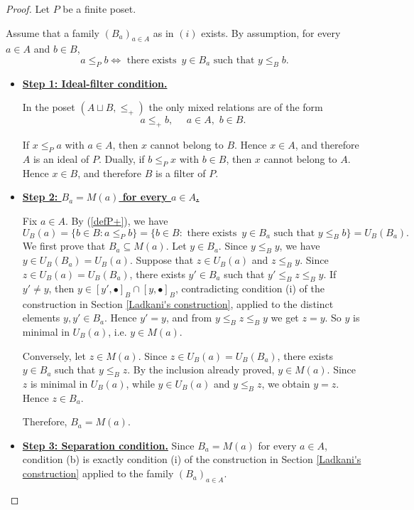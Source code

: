 \begin{proof}
Let $P$ be a finite poset.
\item[\boxed{(i)\Rightarrow(ii)}:]
Assume that a family $(B_a)_{a \in A}$ as in $(i)$ exists. By assumption, for every $a \in A$ and $b \in B$, \begin{equation} \label{defP+}
 a \leq_P b \iff \text{ there exists }\, y \in B_a \text{ such that } y \leq_B b.
 \end{equation}
 \begin{itemize}
 \item \textbf{\underline{Step 1: Ideal-filter condition.}} 
 
 In the poset $(A \sqcup B, \leq_+)$ the only mixed  relations are of the form \[a \leq_+b, \,\,\,\,\,\,\,\, a \in A,\,\, b \in B.\]
 
  If $x \leq_P a$ with $a \in A$, then $x$ cannot belong to $B$. Hence $x \in A$, and therefore $A$ is an ideal of $P$. Dually, if $b \leq_Px$ with $b \in B$, then $x$ cannot belong to $A$. Hence $x \in B$, and therefore $B$ is a filter of $P$.
 
\item \textbf{\underline{Step 2: $B_a=M(a)$ for every $a \in A$.}}

Fix $a \in A$. By (\ref{defP+}), we have \[U_B(a)=\{b \in B \colon a \leq_P b\}=\{b \in B \colon \text{ there exists } \, y \in B_a \text{ such that } y \leq_B b\}=U_B(B_a).\]
We first prove that $B_a \subseteq M(a)$. Let $y \in B_a$. Since $y \leq_By$, we have $y \in U_B(B_a)=U_B(a)$. Suppose that $z \in U_B(a)$ and $z \leq_B y$. Since $z \in U_B(a)=U_B(B_a)$, there exists $y' \in B_a$ such that $y' \leq_B z \leq_B y$. If $y' \neq y$, then $y \in [y', \bullet]_B \cap [y, \bullet]_B$, contradicting condition (i) of the construction in Section \ref{Ladkani's construction}, applied to the distinct elements $y,y' \in B_a$. Hence $y'=y$, and from $y \leq_B z \leq_B y$ we get $z=y$. So $y$ is minimal in $U_B(a)$, i.e. $y \in M(a)$.

Conversely, let $z \in M(a)$. Since $z \in U_B(a)= U_B(B_a)$, there exists $y \in B_a$ such that $y \leq_Bz$. By the inclusion already proved, $y \in M(a)$. Since $z$ is minimal in $U_B(a)$, while $y \in U_B(a)$ and $y \leq_B z$, we obtain $y=z$. Hence $z \in B_a$.

Therefore, $B_a=M(a)$.

\item \textbf{\underline{Step 3: Separation condition.}} Since $B_a=M(a)$ for every $a \in A$, condition (b) is exactly condition (i) of the construction in Section \ref{Ladkani's construction} applied to the family $(B_a)_{a \in A}$.


\end{itemize}
\end{proof}
